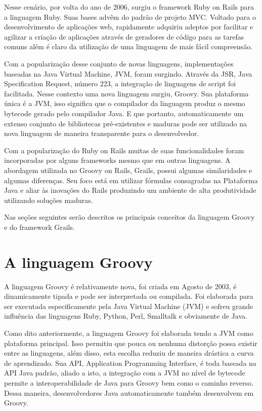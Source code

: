 \documentclass[12pt]{article}
\begin{document}
    Nesse cenário, por volta do ano de 2006, surgiu o framework Ruby on Rails 
    para a linguagem Ruby. Suas bases advêm do padrão de projeto MVC. Voltado 
    para o desenvolvimento de aplicações web, rapidamente adquiriu adeptos por 
    facilitar e agilizar a criação de aplicações através de geradores de código 
    para as tarefas comuns além é claro da utilização de uma linguagem de mais 
    fácil compreensão.

    Com a popularização desse conjunto de novas linguagens, implementações 
    baseadas na Java Virtual Machine, JVM, foram surgindo. Através da JSR, Java 
    Specification Request, número 223, a integração de linguagens de script foi 
    facilitada. Nesse contexto uma nova linguagem surgiu, Groovy. Sua plataforma 
    única é a JVM, isso significa que o compilador da linguagem produz o mesmo
    bytecode gerado pelo compilador Java. E que portanto, automaticamente um 
    extenso conjunto de bibliotecas pré-existentes e maduras pode ser utilizado 
    na nova linguagem de maneira transparente para o desenvolvedor. 
    
    Com a popularização do Ruby on Rails muitas de suas funcionalidades foram 
    incorporadas por alguns frameworks mesmo que em outras linguagens. A 
    abordagem utilizada no Groovy on Rails, Grails, possui algumas similaridades 
    e algumas diferenças. Seu foco está em utilizar fórmulas consagradas na 
    Plataforma Java e aliar às inovações do Rails produzindo um ambiente de alta 
    produtividade utilizando soluções maduras.
    
    Nas seções seguintes serão descritos os principais conceitos da linguagem 
    Groovy e do framework Grails.

\section{A linguagem Groovy} \label{sec:linguagem_groovy}

    A linguagem Groovy é relativamente nova, foi criada em  Agosto de 2003, é 
    dinamicamente tipada e pode ser interpretada ou compilada. Foi elaborada 
    para ser executada especificamente pela Java Virtual Machine (JVM) e sofreu 
    grande influência das linguagens Ruby, Python, Perl, Smalltalk e obviamente 
    de Java.
    
    Como dito anteriormente, a linguagem Groovy foi elaborada tendo a JVM como 
    plataforma principal. Isso permitiu que pouca ou nenhuma distorção possa 
    existir entre as linguagens, além disso, esta escolha reduziu de maneira 
    drástica a curva de aprendizado. Sua API, Application Programming Interface, 
    é toda baseada na API Java padrão, aliado a isto, a integração com a JVM no 
    nível de bytecode permite a interoperabilidade de Java para Groovy bem como 
    o caminho reverso. Dessa maneira, desenvolvedores Java automaticamente 
    também desenvolvem em Groovy.
    
\end{document}

